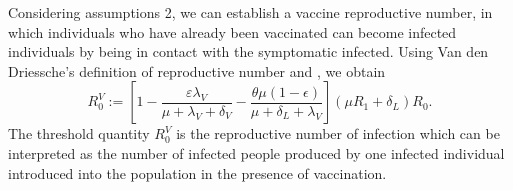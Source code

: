 %
%
%
Considering assumptions 2, we can establish a vaccine reproductive number,
in which individuals who have already been vaccinated
can become infected individuals by being in contact with the
symptomatic infected. Using Van den Driessche’s \cite{VandenDriessche2017a}
definition of reproductive number and \cite{Alexander2004}, we obtain
\begin{equation*}
    R_{0}^V := \left[ 
        1-\frac{\varepsilon \lambda_V}{\mu+\lambda_V+\delta_V}
        -\frac{\theta\mu(1-\epsilon)}{\mu+\delta_L+\lambda_V}
    \right]
    (\mu R_1+\delta_L)R_0.
\end{equation*}
%
The threshold quantity $R_0^V$ is the reproductive number of infection
which can be interpreted as the number of infected people produced
by one infected individual introduced into the population in the
presence of vaccination.


